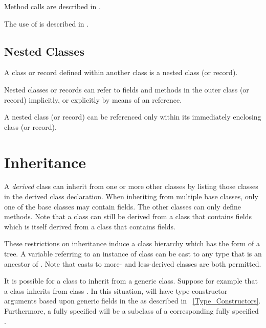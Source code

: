 Method calls are described in .

The use of  is described in .

\subsection{Nested Classes}
\label{Nested_Classes}

A class or record defined within another class is a nested class (or record).

Nested classes or records can refer to fields and methods in the outer class (or
record) implicitly, or explicitly by means of an  reference.

A nested class (or record) can be referenced only within
its immediately enclosing class (or record).

\section{Inheritance}
\label{Inheritance}

A \emph{derived} class can inherit from one or more other classes by
listing those classes in the derived class declaration.
When inheriting from multiple base classes, only one of the base classes
may contain fields.  The other classes can only define methods.  Note
that a class can still be derived from a class that contains fields
which is itself derived from a class that contains fields.  

These restrictions on inheritance induce a class hierarchy which has the form of
a tree.  A variable referring to an instance of class  can be
cast to any type that is an ancestor of .  Note that casts to more- and
less-derived classes are both permitted.

It is possible for a class to inherit from a generic class. Suppose for
example that a class  inherits from class . In this
situation,  will have type constructor arguments based upon
generic fields in the  as described in
~\ref{Type_Constructors}. Furthermore, a fully specified  will be
a subclass of a corresponding fully specified .

